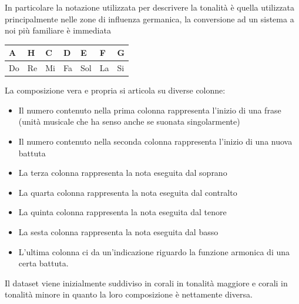 In particolare la notazione utilizzata per descrivere la tonalità è quella utilizzata principalmente nelle zone di influenza germanica, la conversione ad un sistema a noi più familiare è immediata
\begin{table}[H]
\centering
\begin{tabular}{|l|l|l|l|l|l|l|}
\hline
A  & H  & C  & D  & E   & F  & G  \\ \hline
Do & Re & Mi & Fa & Sol & La & Si \\ \hline
\end{tabular}
\end{table}
\noindent
La composizione vera e propria si articola su diverse colonne:
\begin{itemize}
\item Il numero contenuto nella prima colonna rappresenta l'inizio di una frase (unità musicale che ha senso anche se suonata singolarmente)
\item Il numero contenuto nella seconda colonna rappresenta l'inizio di una nuova battuta
\item La terza colonna rappresenta la nota eseguita dal soprano
\item La quarta colonna rappresenta la nota eseguita dal contralto
\item La quinta colonna rappresenta la nota eseguita dal tenore
\item La sesta colonna rappresenta la nota eseguita dal basso
\item L'ultima colonna ci da un'indicazione riguardo la funzione armonica di una certa battuta.
\end{itemize}
\noindent
Il dataset viene inizialmente suddiviso in corali in tonalità maggiore e corali in tonalità minore in quanto la loro composizione è nettamente diversa.

